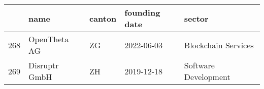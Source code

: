 \begin{tabular}{lllll}
\toprule
{} &           name & canton & founding date &                sector \\
\midrule
268 &   OpenTheta AG &     ZG &    2022-06-03 &   Blockchain Services \\
269 &  Disruptr GmbH &     ZH &    2019-12-18 &  Software Development \\
\bottomrule
\end{tabular}
